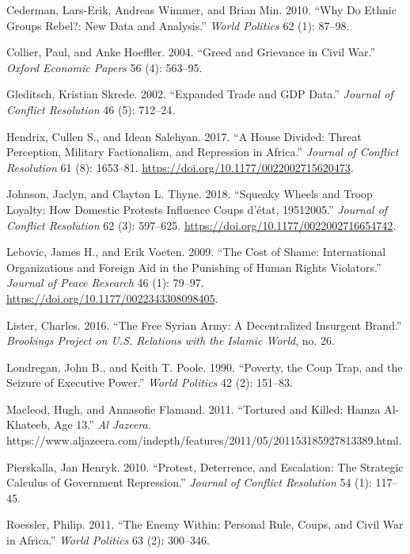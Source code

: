 \documentclass[12pt,]{article}
\theoremstyle{definition}
\theoremstyle{definition}
\theoremstyle{definition}
\theoremstyle{remark}
\begin{document}
\leavevmode\hypertarget{ref-Cederman2010}{}%
Cederman, Lars-Erik, Andreas Wimmer, and Brian Min. 2010. ``Why Do
Ethnic Groups Rebel?: New Data and Analysis.'' \emph{World Politics} 62
(1): 87--98.

\leavevmode\hypertarget{ref-Collier2004}{}%
Collier, Paul, and Anke Hoeffler. 2004. ``Greed and Grievance in Civil
War.'' \emph{Oxford Economic Papers} 56 (4): 563--95.

\leavevmode\hypertarget{ref-Gleditsch2002a}{}%
Gleditsch, Kristian Skrede. 2002. ``Expanded Trade and GDP Data.''
\emph{Journal of Conflict Resolution} 46 (5): 712--24.

\leavevmode\hypertarget{ref-Hendrix2017}{}%
Hendrix, Cullen S., and Idean Salehyan. 2017. ``A House Divided: Threat
Perception, Military Factionalism, and Repression in Africa.''
\emph{Journal of Conflict Resolution} 61 (8): 1653--81.
\url{https://doi.org/10.1177/0022002715620473}.

\leavevmode\hypertarget{ref-Johnson2018}{}%
Johnson, Jaclyn, and Clayton L. Thyne. 2018. ``Squeaky Wheels and Troop
Loyalty: How Domestic Protests Influence Coups d'état, 19512005.''
\emph{Journal of Conflict Resolution} 62 (3): 597--625.
\url{https://doi.org/10.1177/0022002716654742}.

\leavevmode\hypertarget{ref-Lebovic2009}{}%
Lebovic, James H., and Erik Voeten. 2009. ``The Cost of Shame:
International Organizations and Foreign Aid in the Punishing of Human
Rights Violators.'' \emph{Journal of Peace Research} 46 (1): 79--97.
\url{https://doi.org/10.1177/0022343308098405}.

\leavevmode\hypertarget{ref-Lister2016}{}%
Lister, Charles. 2016. ``The Free Syrian Army: A Decentralized Insurgent
Brand.'' \emph{Brookings Project on U.S. Relations with the Islamic
World}, no. 26.

\leavevmode\hypertarget{ref-Londregan1990}{}%
Londregan, John B., and Keith T. Poole. 1990. ``Poverty, the Coup Trap,
and the Seizure of Executive Power.'' \emph{World Politics} 42 (2):
151--83.

\leavevmode\hypertarget{ref-Macleod2011}{}%
Macleod, Hugh, and Annasofie Flamand. 2011. ``Tortured and Killed: Hamza
Al-Khateeb, Age 13.'' \emph{Al Jazeera}.
https://www.aljazeera.com/indepth/features/2011/05/201153185927813389.html.

\leavevmode\hypertarget{ref-Pierskalla2010}{}%
Pierskalla, Jan Henryk. 2010. ``Protest, Deterrence, and Escalation: The
Strategic Calculus of Government Repression.'' \emph{Journal of Conflict
Resolution} 54 (1): 117--45.

\leavevmode\hypertarget{ref-Roessler2011}{}%
Roessler, Philip. 2011. ``The Enemy Within: Personal Rule, Coups, and
Civil War in Africa.'' \emph{World Politics} 63 (2): 300--346.
\end{document}
